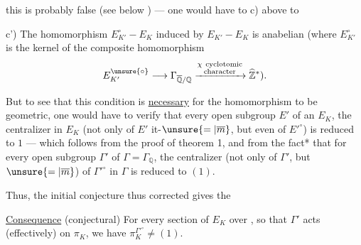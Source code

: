 this is probably false (see below ) --- one would have to    c) above to

c') The homomorphism $E_{K'}^\circ-E_K$ induced by $E_{K'}-E_K$ is anabelian (where $E_{K'}^\circ$ is the kernel of the composite homomorphism
\[
E_{K'}^{\unsure{\circ}}\longrightarrow\Gamma_{\overline{\mathbb Q}/\mathbb Q}\xrightarrow{\substack{\chi\ \text{cyclotomic}\\\text{character}}}\widehat{\mathbb Z}^{*}).
\]

But to see that this condition is \uline{necessary} for the homomorphism to be geometric, one would have to  verify that  every open subgroup $E'$ of an $E_K$, the centralizer in $E_K$ (not only of $E'$ it-$\unsure{=|\overline m}$, but even of $E'^\circ$) is reduced to $1$ --- which follows from the proof of theorem 1, and from the fact* that for every open subgroup $\Gamma'$ of $\Gamma=\Gamma_{\mathbb Q}$, the centralizer (not only of $\Gamma'$, but $\unsure{=|\overline m}$) of $\Gamma'^\circ$ in $\Gamma$ is reduced to $(1)$.

Thus, the initial conjecture thus corrected gives the

\uline{Consequence} (conjectural) For every  section of $E_K$ over  , so that $\Gamma'$ acts (effectively) on $\pi_K$, we have  $\pi_K^{\Gamma'^\circ}\ne(1)$.
